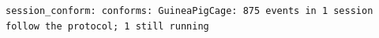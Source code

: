 \begin{lstlisting}[language={},basicstyle=\ttfamily\footnotesize,breaklines=true]
session_conform: conforms: GuineaPigCage: 875 events in 1 session follow the protocol; 1 still running
\end{lstlisting}
